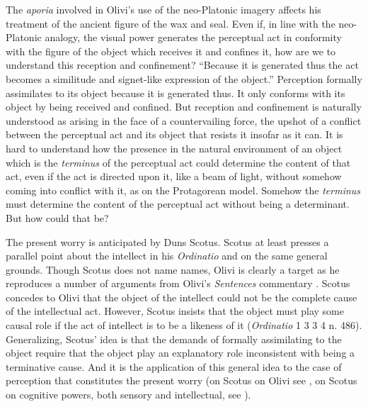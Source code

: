 The \emph{aporia} involved in Olivi's use of the neo-Platonic imagery affects his treatment of the ancient figure of the wax and seal. Even if, in line with the neo-Platonic analogy, the visual power generates the perceptual act in conformity with the figure of the object which receives it and confines it, how are we to understand this reception and confinement? ``Because it is generated thus the act becomes a similitude and signet-like expression of the object.'' Perception formally assimilates to its object because it is generated thus. It only conforms with its object by being received and confined. But reception and confinement is naturally understood as arising in the face of a countervailing force, the upshot of a conflict between the perceptual act and its object that resists it insofar as it can. It is hard to understand how the presence in the natural environment of an object which is the \emph{terminus} of the perceptual act could determine the content of that act, even if the act is directed upon it, like a beam of light, without somehow coming into conflict with it, as on the Protagorean model. Somehow the \emph{terminus} must determine the content of the perceptual act without being a determinant. But how could that be?

The present worry is anticipated by Duns Scotus. Scotus at least presses a parallel point about the intellect in his \emph{Ordinatio} and on the same general grounds. Though Scotus does not name names, Olivi is clearly a target as he reproduces a number of arguments from Olivi's \emph{Sentences} commentary \citep[148]{Pasnau:1997aa}. Scotus concedes to Olivi that the object of the intellect could not be the complete cause of the intellectual act. However, Scotus insists that the object must play some causal role if the act of intellect is to be a likeness of it (\emph{Ordinatio} 1 3 3 4 n. 486). Generalizing, Scotus' idea is that the demands of formally assimilating to the object require that the object play an explanatory role inconsistent with being a terminative cause. And it is the application of this general idea to the case of perception that constitutes the present worry (on Scotus on Olivi see \citealt[chapter 4.4]{Pasnau:1997aa}, on Scotus on cognitive powers, both sensory and intellectual, see \citealt{Cross:2014aa}).

